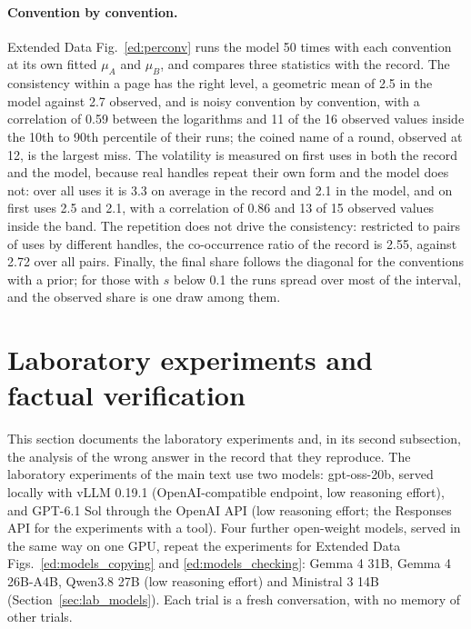 \documentclass[10pt]{article}
\begin{document}
\paragraph{Convention by convention.} Extended Data Fig.~\ref{ed:perconv} runs the model 50 times with each convention at its own fitted $\mu_A$ and $\mu_B$, and compares three statistics with the record. The consistency within a page has the right level, a geometric mean of 2.5 in the model against 2.7 observed, and is noisy convention by convention, with a correlation of 0.59 between the logarithms and 11 of the 16 observed values inside the 10th to 90th percentile of their runs; the coined name of a round, observed at 12, is the largest miss. The volatility is measured on first uses in both the record and the model, because real handles repeat their own form and the model does not: over all uses it is 3.3 on average in the record and 2.1 in the model, and on first uses 2.5 and 2.1, with a correlation of 0.86 and 13 of 15 observed values inside the band. The repetition does not drive the consistency: restricted to pairs of uses by different handles, the co-occurrence ratio of the record is 2.55, against 2.72 over all pairs. Finally, the final share follows the diagonal for the conventions with a prior; for those with $s$ below 0.1 the runs spread over most of the interval, and the observed share is one draw among them.

\clearpage
\section{Laboratory experiments and factual verification}\label{sec:lab}

This section documents the laboratory experiments and, in its second subsection, the analysis of the wrong answer in the record that they reproduce. The laboratory experiments of the main text use two models: gpt-oss-20b, served locally with vLLM 0.19.1 (OpenAI-compatible endpoint, low reasoning effort), and GPT-6.1 Sol through the OpenAI API (low reasoning effort; the Responses API for the experiments with a tool). Four further open-weight models, served in the same way on one GPU, repeat the experiments for Extended Data Figs.~\ref{ed:models_copying} and \ref{ed:models_checking}: Gemma 4 31B, Gemma 4 26B-A4B, Qwen3.8 27B (low reasoning effort) and Ministral 3 14B (Section~\ref{sec:lab_models}). Each trial is a fresh conversation, with no memory of other trials.
\end{document}
